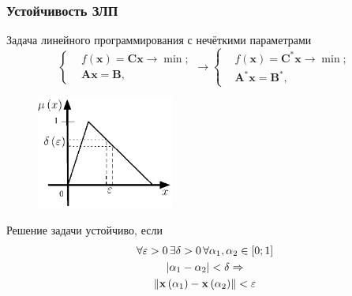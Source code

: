 \documentclass[12pt]{beamer}
\begin{document}
\begin{frame}
  \frametitle{Устойчивость ЗЛП}
  Задача линейного программирования с нечёткими параметрами
    \begin{equation}
      \label{eq:fuzzy-lp-unstable-problem}
      \left\{ \begin{aligned}
        & f\left( \mathbf{x} \right)=\mathbf{Cx}\to \min;  \\ 
        & \mathbf{Ax}=\mathbf{B},
      \end{aligned} \right.
      \to
      \left\{ \begin{aligned}
        & f\left( \mathbf{x} \right)={\mathbf{C}^{*}}\mathbf{x}\to \min;  \\ 
        & {\mathbf{A}^{*}}\mathbf{x}={\mathbf{B}}^{*},
      \end{aligned} \right.
    \end{equation}
    
  \begin{figure}
    \includegraphics[width=0.4\textwidth]{stability}
  \end{figure}

  Решение задачи устойчиво, если
        \begin{gather}
        \forall \varepsilon >0\, \exists \delta >0\, \forall \alpha_1, \alpha_2 \in \left[0; 1\right] \notag \\
        \left| \alpha_1 - \alpha_2 \right|<\delta \Rightarrow   \notag \\
        \label{eq:fuzzy-solution-stability}
        \left\| \mathbf{x}\left( \alpha_1 \right)-\mathbf{x} \left( \alpha_2  \right) \right\|<\varepsilon
        \end{gather}

\end{frame}

\end{document}
